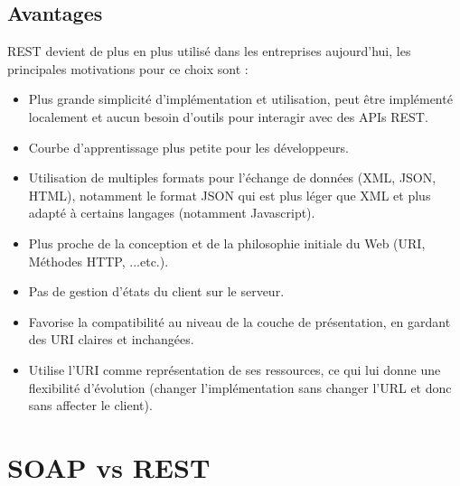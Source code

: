 \subsection{Avantages}
REST devient de plus en plus utilisé dans les entreprises aujourd'hui, les principales motivations pour ce choix sont \cite{refSOAPvsREST} :
\begin{itemize}
	\item Plus grande simplicité d'implémentation et utilisation, peut être implémenté localement et aucun besoin d'outils pour interagir avec des APIs REST.
	\item Courbe d'apprentissage plus petite pour les développeurs.
	\item Utilisation de multiples formats pour l'échange de données (XML, JSON, HTML), notamment le format JSON qui est plus léger que XML et plus adapté à certains langages (notamment Javascript).
	\item Plus proche de la conception et de la philosophie initiale du Web (URI, Méthodes HTTP, ...etc.).
	\item Pas de gestion d'états du client sur le serveur.
	\item Favorise la compatibilité au niveau de la couche de présentation, en gardant des URI claires et inchangées.
	\item Utilise l'URI comme représentation de ses ressources, ce qui lui donne une flexibilité d'évolution (changer l'implémentation sans changer l'URL et donc sans affecter le client).
\end{itemize}

\section{SOAP vs REST}

